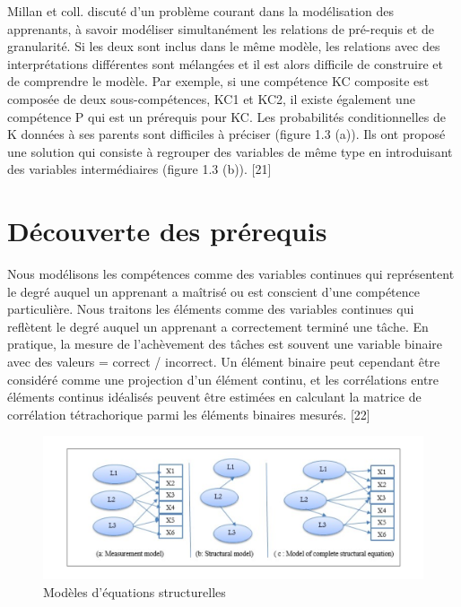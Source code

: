 Millan et coll. discuté d'un problème courant dans la modélisation des apprenants, à savoir modéliser simultanément les relations de pré-requis et de granularité. Si les deux sont inclus dans le même modèle, les relations avec des interprétations différentes sont mélangées et il est alors difficile de construire et de comprendre le modèle. Par exemple, si une compétence KC composite est composée de deux sous-compétences, KC1 et KC2, il existe également une compétence P qui est un prérequis pour KC. Les probabilités conditionnelles de K données à ses parents sont difficiles à préciser (figure 1.3 (a)). Ils ont proposé une solution qui consiste à regrouper des variables de même type en introduisant des variables intermédiaires (figure 1.3 (b)). [21]

\section{Découverte des prérequis}
Nous modélisons les compétences comme des variables continues qui représentent le degré auquel un apprenant a maîtrisé ou est conscient d'une compétence particulière. Nous traitons les éléments comme des variables continues qui reflètent le degré auquel un apprenant a correctement terminé une tâche. En pratique, la mesure de l'achèvement des tâches est souvent une variable binaire avec des valeurs = correct / incorrect. Un élément binaire peut cependant être considéré comme une projection d'un élément continu, et les corrélations entre éléments continus idéalisés peuvent être estimées en calculant la matrice de corrélation tétrachorique parmi les éléments binaires mesurés. [22]

\begin{figure}[H]
	\begin{center}
		\includegraphics[width=\textwidth]{images/chapitre2/Modèles d'équations structurelles.png}
	\end{center}
\caption{Modèles d'équations structurelles}
\label{modeleEquation}
\end{figure}

